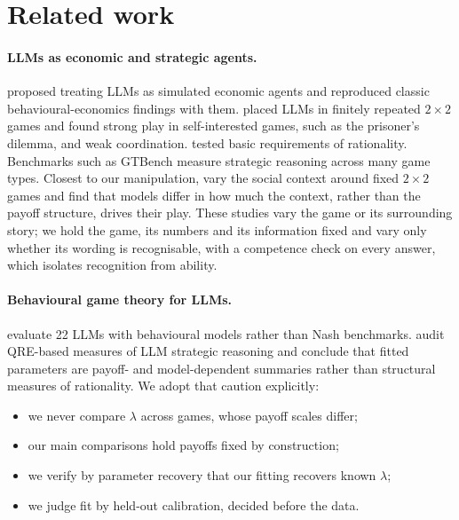 \documentclass[10pt]{article}
\theoremstyle{definition}
\theoremstyle{remark}
\newcommand{\lam}{\lambda}
\begin{document}
\section{Related work}\label{sec:related}

\paragraph{LLMs as economic and strategic agents.} \citet{horton2023homo} proposed treating LLMs
as simulated economic agents and reproduced classic behavioural-economics findings with them.
\citet{akata2025repeated} placed LLMs in finitely repeated $2\times2$ games and found strong play
in self-interested games, such as the prisoner's dilemma, and weak coordination.
\citet{fan2024rational} tested basic requirements of rationality. Benchmarks such as GTBench
\citep{duan2024gtbench} measure strategic reasoning across many game types. Closest to our
manipulation, \citet{lore2024strategic} vary the social context around fixed $2\times2$ games and
find that models differ in how much the context, rather than the payoff structure, drives
their play. These studies vary the game or its surrounding story; we hold the game, its numbers
and its information fixed and vary only whether its wording is recognisable, with a competence
check on every answer, which isolates recognition from ability.

\paragraph{Behavioural game theory for LLMs.} \citet{jia2025behavioral} evaluate 22 LLMs with
behavioural models rather than Nash benchmarks. \citet{pechon2026auditing} audit QRE-based
measures of LLM strategic reasoning and conclude that fitted parameters are payoff- and
model-dependent summaries rather than structural measures of rationality. We adopt that caution
explicitly:
\begin{itemize}
\item we never compare $\lam$ across games, whose payoff scales differ;
\item our main comparisons hold payoffs fixed by construction;
\item we verify by parameter recovery that our fitting recovers known $\lam$;
\item we judge fit by held-out calibration, decided before the data.
\end{itemize}
\end{document}
